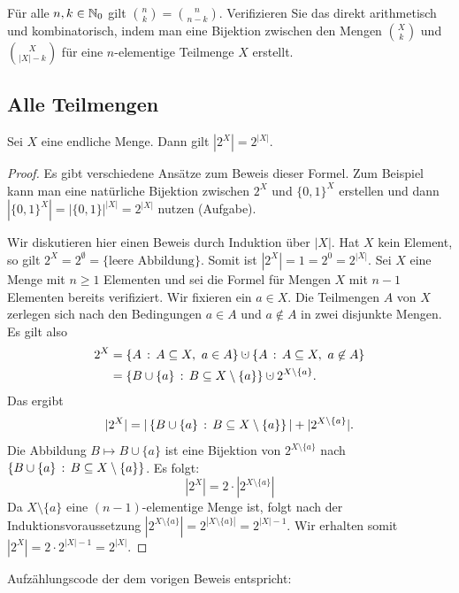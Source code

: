 \begin{aufg}
	Für alle $n,k \in \mathbb{N}_0$ gilt $\binom{n}{k} = \binom{n}{n-k}$. Verifizieren Sie das direkt arithmetisch und kombinatorisch, indem man eine Bijektion zwischen 
	den Mengen $\binom{X}{k}$ und $\binom{X}{|X|-k}$ für eine $n$-elementige Teilmenge $X$ erstellt. 
\end{aufg} 

\subsection{Alle Teilmengen} 

\begin{thm}
\label{thm:kard-potenzmenge}
	Sei $X$ eine endliche Menge. Dann gilt $|2^X|=2^{|X|}$. 
\end{thm} 
\begin{proof} 
	Es gibt verschiedene Ansätze zum Beweis dieser Formel. Zum Beispiel kann man eine natürliche Bijektion zwischen  $2^X$ und $\{0,1\}^X$ erstellen und dann $|\{0,1\}^X| = |\{0,1\}|^{|X|} = 2^{|X|}$ nutzen (Aufgabe). 
	
	Wir diskutieren hier einen Beweis durch Induktion über $|X|$. Hat $X$ kein Element, so gilt $2^X = 2^\emptyset = \{\text{leere Abbildung}\}$. Somit ist $|2^X| = 1 = 2^0 = 2^{|X|}$. Sei $X$ eine Menge mit $n \ge 1$ Elementen und sei die Formel für Mengen $X$ mit $n-1$ Elementen bereits verifiziert. Wir fixieren ein $a \in X$. Die Teilmengen $A$ von $X$ zerlegen sich nach den Bedingungen $a \in A$ und $a \not\in A$ in zwei disjunkte Mengen. Es gilt also
	\begin{align*}
			2^X & = \setcond{A}{A \subseteq X, \ a \in A} \cupdot \setcond{A}{A \subseteq X, \ a \not\in A}
			\\ & = \setcond{B \cup \{a\}}{B \subseteq X \setminus \{a\}} \cupdot 2^{X \setminus \{a\}}. 
	\end{align*}
	Das ergibt
	\[
		|2^X| = |\left\{ B \cup \{a\} \,:\, B \subseteq X \setminus \{a\} \right\}| + | 2^{X \setminus \{a\}}|. 
	\]
	Die Abbildung $B \mapsto B \cup \{a\}$ ist eine Bijektion von $2^{X \setminus \{a\}}$ nach $\left\{ B \cup \{a\} \,:\, B \subseteq X \setminus \{a\} \right\}$. Es folgt: 
	\[
		|2^X| = 2 \cdot |2^{X \setminus \{a\}}|
	\]
	Da $X \setminus \{a\}$ eine $(n-1)$-elementige Menge ist, folgt nach der Induktionsvoraussetzung $|2^{X \setminus \{a\}}| = 2^{|X \setminus \{a\}|} = 2^{|X|-1}$. Wir erhalten somit $|2^{X}| = 2 \cdot 2^{|X|-1} = 2^{|X|}$. 
\end{proof} 

\begin{bem} Aufzählungscode der dem vorigen Beweis entspricht: 

\end{bem} 

